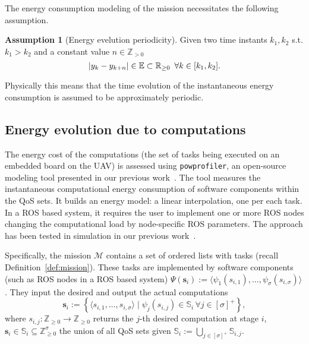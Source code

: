 \documentclass[letterpaper,10pt,conference]{ieeeconf}
\newcommand{\stt}[1]{{\small\tt #1}} %
\newcommand{\powprof}{\stt{powprofiler}}
\DeclarePairedDelimiter\abs{\lvert}{\rvert}%
\theoremstyle{definition}
\newtheorem{assm}[thm]{Assumption}
\begin{document}
The energy consumption modeling of the mission necessitates the following assumption.
\begin{assm}[Energy evelution periodicity]\label{assm:periodic} 
Given two time instants $k_1,k_2$ s.t. $k_1>k_2$ and a constant value $n\in\mathbb{Z}_{> 0}$
\begin{equation}
  \abs{y_{k}-y_{k+n}}\in\mathbb{E}\subset\mathbb{R}_{\geq 0} \,\,\,\forall k\in[k_1,k_2].
\end{equation}
\end{assm}

Physically this means that the time evolution of the instantaneous energy consumption is assumed to be approximately periodic.

\subsection{Energy evolution due to computations}
\label{sec:computations-model}

The energy cost of the computations (the set of tasks being executed on an embedded board on the UAV) is assessed using \powprof{}, an open-source modeling tool presented in our previous work~\cite{seewald2019coarse}. The tool measures the instantaneous computational energy consumption of software components within the QoS sets. It builds an energy model: a linear interpolation, one per each task. In a ROS based system, it requires the user to implement one or more ROS nodes changing the computational load by node-specific ROS parameters. The approach has been tested in simulation in our previous work~\cite{zamanakos2020energy}.

Specifically, the mission $\mathcal{M}$ contains a set of ordered lists with tasks (recall Definition~\ref{def:mission}). These tasks are implemented by software components (such as ROS nodes in a ROS based system) $\Psi(\mathbf{s}_i):=\langle\psi_1(s_{i,1}),\dots,\psi_\sigma(s_{i,\sigma})\rangle$. They input the desired and output the actual computations
\begin{equation}\label{eq:qos-def}
  \mathbf{s}_i:=\left\{\langle s_{i,1},\dots ,s_{i,\sigma}\rangle\mid \psi_j(s_{i,j})\in\mathbb{S}_{i}\,\forall j\in[\sigma]^+\right\},
\end{equation}
where $s_{i,j}:\mathbb{Z}_{\geq 0}\rightarrow\mathbb{Z}_{\geq 0}$ returns the $j$-th desired computation at stage $i$, $\mathbf{s}_i\in\mathbb{S}_i\subseteq\mathbb{Z}_{\geq 0}^\sigma$ the union of all QoS sets given $\mathbb{S}_i:=\bigcup_{j\in[\sigma]^+}{\mathbb{S}_{i,j}}$.
\end{document}
